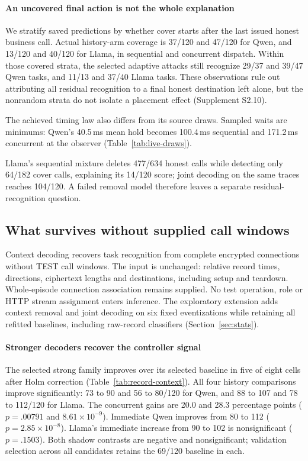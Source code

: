 \paragraph{An uncovered final action is not the whole explanation}
We stratify saved predictions by whether cover starts after the last issued honest business call. Actual history-arm coverage is 37/120 and 47/120 for Qwen, and 13/120 and 40/120 for Llama, in sequential and concurrent dispatch. Within those covered strata, the selected adaptive attacks still recognize 29/37 and 39/47 Qwen tasks, and 11/13 and 37/40 Llama tasks. These observations rule out attributing all residual recognition to a final honest destination left alone, but the nonrandom strata do not isolate a placement effect (Supplement S2.10).

The achieved timing law also differs from its source draws. Sampled waits are minimums: Qwen's 40.5\,ms mean hold becomes 100.4\,ms sequential and 171.2\,ms concurrent at the observer (Table~\ref{tab:live-draws}).

Llama's sequential mixture deletes 477/634 honest calls while detecting only 64/182 cover calls, explaining its 14/120 score; joint decoding on the same traces reaches 104/120. A failed removal model therefore leaves a separate residual-recognition question.

\subsection{What survives without supplied call windows}\label{sec:noboundary}
Context decoding recovers task recognition from complete encrypted connections without TEST call windows. The input is unchanged: relative record times, directions, ciphertext lengths and destinations, including setup and teardown. Whole-episode connection association remains supplied. No test operation, role or HTTP stream assignment enters inference. The exploratory extension adds context removal and joint decoding on six fixed eventizations while retaining all refitted baselines, including raw-record classifiers (Section~\ref{sec:stats}).


\paragraph{Stronger decoders recover the controller signal}
The selected strong family improves over its selected baseline in five of eight cells after Holm correction (Table~\ref{tab:record-context}). All four history comparisons improve significantly: 73 to 90 and 56 to 80/120 for Qwen, and 88 to 107 and 78 to 112/120 for Llama. The concurrent gains are 20.0 and 28.3 percentage points ($p=.00791$ and $8.61\times10^{-9}$). Immediate Qwen improves from 80 to 112 ($p=2.85\times10^{-8}$). Llama's immediate increase from 90 to 102 is nonsignificant ($p=.1503$). Both shadow contrasts are negative and nonsignificant; validation selection across all candidates retains the 69/120 baseline in each.

